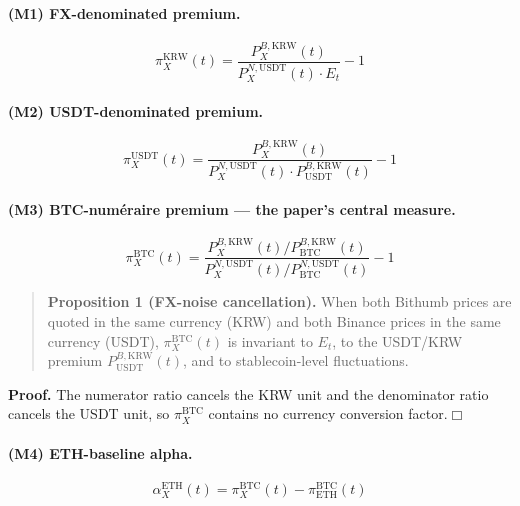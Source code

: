 \documentclass[11pt,a4paper]{article}
\begin{document}
\paragraph{(M1) FX-denominated premium.}
\begin{equation}
\pi^{\text{KRW}}_X(t) = \frac{P_X^{B,\text{KRW}}(t)}{P_X^{N,\text{USDT}}(t)\cdot E_t}-1
\label{eq:pi_krw}
\end{equation}

\paragraph{(M2) USDT-denominated premium.}
\begin{equation}
\pi^{\text{USDT}}_X(t) = \frac{P_X^{B,\text{KRW}}(t)}{P_X^{N,\text{USDT}}(t)\cdot P_{\text{USDT}}^{B,\text{KRW}}(t)}-1
\label{eq:pi_usdt}
\end{equation}

\paragraph{(M3) BTC-num\'eraire premium --- the paper's central measure.}
\begin{equation}
\boxed{\;
\pi^{\text{BTC}}_X(t) = \frac{P_X^{B,\text{KRW}}(t)/P_{\text{BTC}}^{B,\text{KRW}}(t)}
                                {P_X^{N,\text{USDT}}(t)/P_{\text{BTC}}^{N,\text{USDT}}(t)} - 1
\;}
\label{eq:pi_btc}
\end{equation}

\begin{quote}
\textbf{Proposition 1 (FX-noise cancellation).}
When both Bithumb prices are quoted in the same currency (KRW) and both Binance prices in the same
currency (USDT), $\pi^{\text{BTC}}_X(t)$ is invariant to $E_t$, to the USDT/KRW premium
$P_{\text{USDT}}^{B,\text{KRW}}(t)$, and to stablecoin-level fluctuations.
\end{quote}

\noindent\textbf{Proof.} The numerator ratio cancels the KRW unit and the denominator ratio cancels
the USDT unit, so $\pi^{\text{BTC}}_X$ contains no currency conversion factor.\hfill$\Box$

\paragraph{(M4) ETH-baseline alpha.}
\begin{equation}
\alpha_X^{\text{ETH}}(t) = \pi^{\text{BTC}}_X(t) - \pi^{\text{BTC}}_{\text{ETH}}(t)
\label{eq:alpha}
\end{equation}
\end{document}
